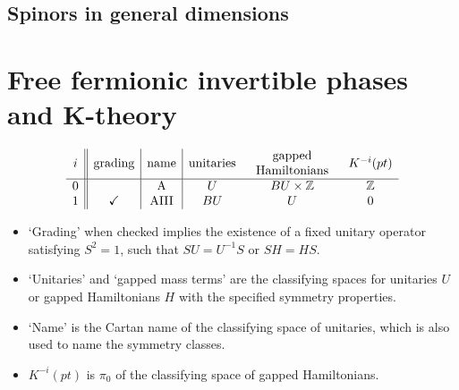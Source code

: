 \documentclass[12pt]{article}
\numberwithin{equation}{section}
\numberwithin{figure}{section}
\theoremstyle{remark}
\renewenvironment{table}[1][]{
  \begin{originaltable}[#1]
    \begin{mdframed}[linecolor=black!0,backgroundcolor=black!1]
}{
    \end{mdframed}
  \end{originaltable}
}
\def\bZ{\mathbb{Z}}
\begin{document}
\subsection{Spinors in general dimensions}

\goodbreak

\section{Free fermionic invertible phases and K-theory}

\begin{table}
\[
\begin{array}{c||c|c|ccc}
i & \text{grading}& \text{name} & \text{unitaries} & \begin{tabular}{c} gapped \\ Hamiltonians\end{tabular} & K^{-i}(pt)\\
\hline
0&  & \text{A} & U & BU \times \bZ& \bZ \\
1 & \checkmark & \text{AIII} & BU & U & 0
\end{array}
\]
\medskip
\begin{itemize}
\item `Grading' when checked implies the existence of a fixed unitary operator satisfying $S^2=1$,
such that $SU=U^{-1}S$ or $SH=HS$.
\item `Unitaries' and `gapped mass terms' are the classifying spaces for unitaries $U$ or
gapped Hamiltonians $H$ with the specified symmetry properties.
\item `Name' is the Cartan name of the classifying space of unitaries, 
which is also used to name the symmetry classes.
\item $K^{-i}(pt)$ is $\pi_0$ of the classifying space of gapped Hamiltonians.
\end{itemize}
\caption{Symmetry classes: two complex ones.}
\end{table}
\end{document}
